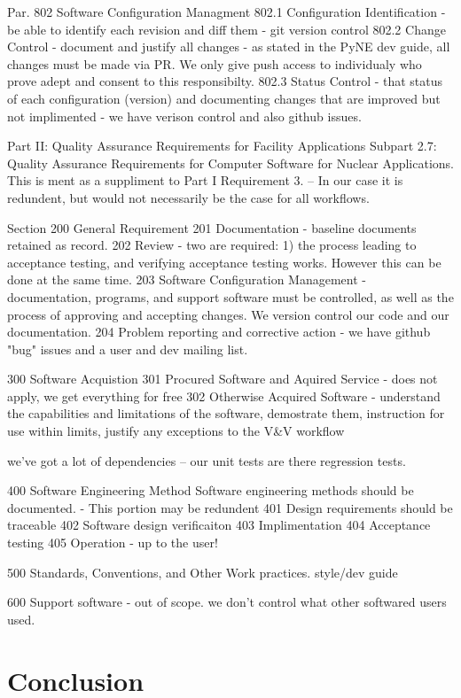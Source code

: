 \documentclass{anstrans}
\begin{document}
Par. 802 Software Configuration Managment
802.1 Configuration Identification - be able to identify each revision and diff them - git version control
802.2 Change Control - document and justify all changes - as stated in the PyNE dev guide, all changes must be made via PR. We only give push access to individualy who prove adept and consent to this responsibilty.
802.3 Status Control - that status of each configuration (version) and documenting changes that are improved but not implimented - we have verison control and also github issues.


Part II: Quality Assurance Requirements for Facility Applications
Subpart 2.7: Quality Assurance Requirements for Computer Software for Nuclear Applications.
This is ment as a suppliment to Part I Requirement 3. -- In our case it is redundent, but would not necessarily be the case for all workflows.

Section 200 General Requirement
201 Documentation - baseline documents retained as record.
202 Review  - two are required: 1) the process leading to acceptance testing, and verifying acceptance testing works. However this can be done at the same time.
203 Software Configuration Management - documentation, programs, and support software must be controlled, as well as the process of approving and accepting changes. We version control our code and our documentation.
204 Problem reporting and corrective action - we have github "bug" issues and a user and dev mailing list.



300 Software Acquistion
301 Procured Software and Aquired Service - does not apply, we get everything for free
302 Otherwise Acquired Software - understand the capabilities and limitations of the software, demostrate them, instruction for use within limits, justify any exceptions to the V\&V workflow

we've got a lot of dependencies -- our unit tests are there regression tests.

400 Software Engineering Method
Software engineering methods should be documented.
- This portion may be redundent
401 Design requirements should be traceable
402 Software design verificaiton
403 Implimentation
404 Acceptance testing
405 Operation - up to the user!

500 Standards, Conventions, and Other Work practices. style/dev guide

600 Support software - out of scope. we don't control what other softwared users used. 


\section{Conclusion}




\end{document}
